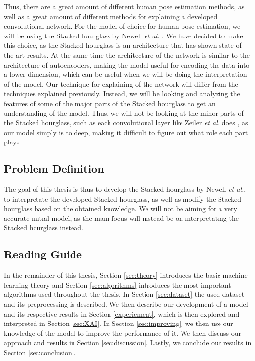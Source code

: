 \documentclass[./main.tex]{subfiles}
\begin{document}
Thus, there are a great amount of different human pose estimation methods, as well as a great amount of different methods for explaining a developed convolutional network. For the model of choice for human pose estimation, we will be using the Stacked hourglass by Newell \textit{et al.} \cite{Newell}. We have decided to make this choice, as the Stacked hourglass is an architecture that has shown state-of-the-art results. At the same time the architecture of the network is similar to the architecture of autoencoders, making the model useful for encoding the data into a lower dimension, which can be useful when we will be doing the interpretation of the model. Our technique for explaining of the network will differ from the techniques explained previously. Instead, we will be looking and analyzing the features of some of the major parts of the Stacked hourglass to get an understanding of the model. Thus, we will not be looking at the minor parts of the Stacked hourglass, such as each convolutional layer like Zeiler \textit{et al.} does \cite{Zeiler}, as our model simply is to deep, making it difficult to figure out what role each part plays.

\subsection{Problem Definition}
The goal of this thesis is thus to develop the Stacked hourglass by Newell \textit{et al.}, to interpretate the developed Stacked hourglass, as well as modify the Stacked hourglass based on the obtained knowledge. We will not be aiming for a very accurate initial model, as the main focus will instead be on interpretating the Stacked hourglass instead.

\subsection{Reading Guide}
In the remainder of this thesis, Section \ref{sec:theory} introduces the basic machine learning theory and Section \ref{sec:algorithms} introduces the most important algorithms used throughout the thesis. In Section \ref{sec:dataset} the used dataset and its preprocessing is described. We then describe our development of a model and its respective results in Section \ref{experiement}, which is then explored and interpreted in Section \ref{sec:XAI}. In Section \ref{sec:improving}, we then use our knowledge of the model to improve the performance of it. We then discuss our approach and results in Section \ref{sec:discussion}. Lastly, we conclude our results in Section \ref{sec:conclusion}.
\end{document}
